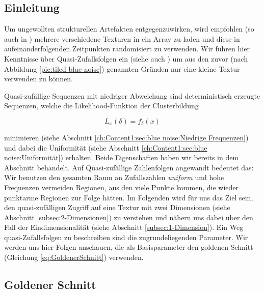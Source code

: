 \subsection{Einleitung}

Um ungewollten strukturellen Artefakten entgegenzuwirken, wird empfohlen (so auch in \cite{bluenoisechrisschied})
mehrere verschiedene  Texturen in ein Array zu laden und diese in aufeinanderfolgenden
Zeitpunkten randomisiert zu verwenden. Wir führen hier Kenntnisse über Quasi-Zufallsfolgen ein (siehe auch \cite{quasirandomsequencesbyRoberts}) 
um aus den zuvor (nach Abbildung \ref{pic:tiled blue noise}) genannten Gründen nur eine kleine  Textur verwenden zu können.\par
Quasi-zufällige Sequenzen mit niedriger Abweichung sind deterministisch erzeugte Sequenzen, welche die Likelihood-Funktion der Clusterbildung

\begin{tcolorbox}[rightrule=3mm, rounded corners=east]
    \begin{equation}\label{eq:Likeli-Hood-Gleichung}
        L_{x}(\delta) = f_{\delta}(x)
    \end{equation}
\end{tcolorbox}

minimieren (siehe Abschnitt \ref{ch:Content1:sec:blue noise:Niedrige Frequenzen}) und dabei die 
Uniformität (siehe Abschnitt \ref{ch:Content1:sec:blue noise:Uniformität}) erhalten. Beide Eigenschaften 
haben wir bereits in dem  Abschnitt behandelt.
Auf Quasi-zufällige Zahlenfolgen angewandt bedeutet das: Wir benutzen den gesamten Raum an Zufallszahlen
\textit{uniform} und hohe Frequenzen vermeiden Regionen, aus den viele Punkte kommen, die wieder 
punktarme Regionen zur Folge hätten.   
Im Folgenden wird für uns das Ziel sein, den quasi-zufälligen Zugriff auf eine Textur 
mit zwei Dimensionen (siehe Abschnitt \ref{subsec:2-Dimensionen}) zu verstehen und nähern 
uns dabei über den Fall der Eindimensionalität (siehe Abschnitt \ref{subsec:1-Dimension}).
Ein Weg quasi-Zufallsfolgen zu beschreiben sind die zugrundeliegenden Parameter. 
Wir werden uns hier Folgen anschauen, die als Basisparameter den 
goldenen Schnitt (Gleichung \ref{eq:GoldenerSchnitt}) verwenden.

\subsection{Goldener Schnitt}

